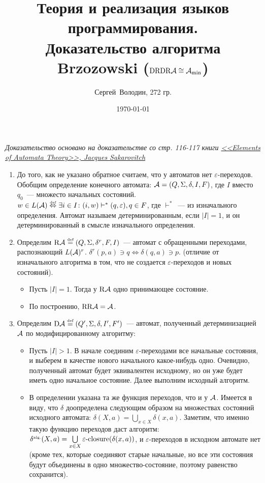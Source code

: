 \documentclass[a4paper]{article}
\title{Теория и реализация языков программирования.\\Доказательство алгоритма Brzozowski ($\mathrm{DRDR}\A\cong\A_{\min}$)}
\date{\today}
\author{Сергей~Володин, 272 гр.}
\def\A{{\cal A}}
\def\eqdef{\overset{\mbox{\tiny def}}{=}}
\def\D{{\mathrm{D}}}
\def\R{{\mathrm{R}}}
\begin{document}
\maketitle
{\em{Доказательство основано на доказательстве со стр. 116-117 книги \href{http://lib.mipt.ru/book/283234/}{<<Elements of Automata Theory>>, Jacques Sakarovitch}}}
\begin{enumerate}
\item До того, как не указано обратное считаем, что у автоматов нет $\varepsilon$-переходов.\newline
Обобщим определение конечного автомата: $\A=(Q,\Sigma,\delta,I,F)$, где $I$ вместо $q_0$~--- множесто начальных состояний.\newline
$w\in L(\A)\overset{\mbox{\tiny def}}{\Leftrightarrow} \exists i\in I\colon (i,w)\vdash^*(q,\varepsilon), q\in F$, где $\vdash^*$~--- из изначального определения. Автомат называем детерминированным, если $|I|=1$, и он детерминированный в смысле изначального определения.
\item Определим $\R\A\eqdef(Q,\Sigma,\delta^r,F,I)$~--- автомат с обращенными переходами, распознающий $L(\A)^r$. $\delta^r(p,a)\ni q\Leftrightarrow \delta(q,a)\ni p$. (отличие от изначального алгоритма в том, что не создается $\varepsilon$-переходов и новых состояний).
\begin{itemize}
\item Пусть $|I|=1$. Тогда у $\R\A$ одно принимающее состояние.
\item По построению, $\R\R\A=\A$.
\end{itemize}
\item Определим $\D\A\eqdef(Q',\Sigma,\delta,I',F')$~--- автомат, полученный детерминизацией $\A$ по модифицированному алгоритму:
\begin{itemize}
\item Пусть $|I|>1$. В начале соединим $\varepsilon$-переходами все начальные состояния, и выберем в качестве нового начального какое-нибудь одно. Очевидно, полученный автомат будет эквивалентен исходному, но он уже будет иметь одно начальное состояние. Далее выполним исходный алгоритм.
\item В определении указана та же функция переходов, что и у $\A$. Имеется в виду, что $\delta$ доопределена следующим образом на множествах состояний исходного автомата: $\delta(X,a)=\bigcup\limits_{x\in X}\delta(x,a)$. Заметим, что именно такую функцию переходов даст алгоритм: $\delta^{\mbox{\tiny alg.}}(X,a)=\bigcup\limits_{x\in X}\varepsilon\mbox{-closure}(\delta(x,a))$, и $\varepsilon$-переходов в исходном автомате нет (кроме тех, которые соединяют старые начальные, но все эти состояния будут объединены в одно множество-состояние, поэтому равенство сохранится).

\end{itemize}
\end{enumerate}
\end{document}
